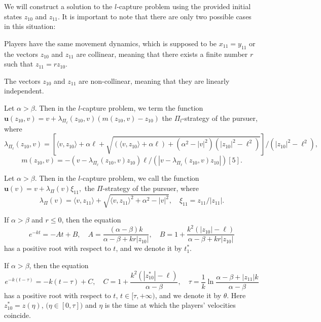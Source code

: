 \documentclass[12pt]{llncs}
\begin{document}
We will construct a solution to the $l$-capture problem using the provided initial states $z_{10}$ and $z_{11}$. It is important to note that there are only two possible cases in this situation:
\begin{case}
Players have the same movement dynamics, which is supposed to be $x_{11}=y_{11}$ or the vectors $z_{10}$ and $z_{11}$ are collinear, meaning that there exists a finite number $r$ such that $z_{11}=r z_{10}$.
\end{case}
\begin{case}
The vectors $z_{10}$ and $z_{11}$ are non-collinear, meaning that they are linearly independent.
\end{case}
\begin{definition}
Let $\alpha>\beta$. Then  in the $l$-capture problem, we term the function \\
$
\textbf{u}(z_{10}, v)=v+\lambda_{\Pi_\ell}(z_{10},v)\left(m(z_{10},v)-z_{10}\right)
$
 the $\Pi_l$-strategy of the pursuer, where
\begin{equation*}
\lambda_{\Pi_\ell}(z_{10}, v)=\left[\langle v, z _{10}\rangle+\alpha \ell+\sqrt{(\langle v, z _{10}\rangle+\alpha \ell)+(\alpha^{2}-|v|^{2})(|z_{10}|^2-\ell^2)}\right]/(|z_{10}|^2-\ell^2),
 \end{equation*}
 $$
 m(z_{10},v)=-(v-\lambda_{\Pi_\ell}(z_{10},v) z_{10})\ell/(|v-\lambda_{\Pi_\ell}(z_{10},v) z_{10}|) [5].
 $$
\end{definition}
\begin{definition}
Let $\alpha>\beta$. Then  in the $l$-capture problem, we call the function \\
$
\textbf{u}(v)=v+\lambda_{\Pi}(v)\xi_{11},
$
the $\Pi$-strategy of the pursuer, where
\begin{equation*}
\lambda_{\Pi}(v)=\langle v, z _{11}\rangle+\sqrt{\langle v, z _{11}\rangle^2+\alpha^{2}-|v|^{2}},\quad \xi_{11}=z _{11}/|z _{11}|.
 \end{equation*}
\end{definition}
\begin{proposition}
If $\alpha>\beta$ and $r\leq0$, then the equation
\begin{equation*}
e^{-kt}=-At+B,\quad A=\frac{(\alpha-\beta)k}{\alpha-\beta+kr|z_{10}|},\quad B=1+\frac{k^2(|z_{10}|-\ell)}{\alpha-\beta+kr|z_{10}|}
\end{equation*}
has a positive root with respect to $t$, and we denote it by $t^{*}_{1}$.
\end{proposition}

\begin{proposition}
If $\alpha>\beta$, then the equation
\begin{equation*}
e^{-k(t-\tau)}=-k(t-\tau)+C,\quad C=1+\frac{k^2(|z^{*}_{10}|-\ell)}{\alpha-\beta},\quad \tau=\frac{1}{k}\ln{\frac{\alpha-\beta+|z_{11}|k}{\alpha-\beta}}
\end{equation*}
has a positive root with respect to $t$, $t\in[\tau,+\infty)$, and we denote it by $\theta$. Here $z^{*}_{10}=z(\eta)$, $\big(\eta\in[0,\tau]\big)$ and $\eta$ is the time at which the players' velocities coincide.
\end{proposition}
\end{document}
